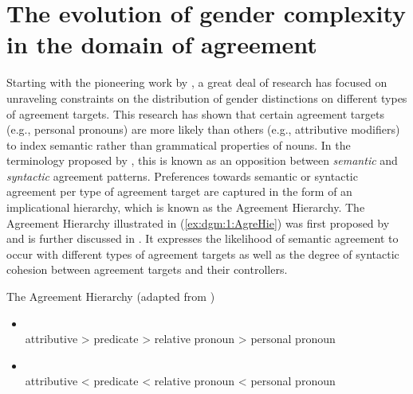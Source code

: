 \documentclass[output=collectionpaper]{langsci/langscibook}
\begin{document}
\section{The evolution of gender complexity in the domain of agreement}
\label{sec:dgm:EvAgr}
\largerpage
Starting with the pioneering work by \citet{Corbett1979,Corbett1991}, a great deal of research has focused on unraveling constraints on the distribution of gender distinctions on different types of agreement targets. This research has shown that certain agreement targets (e.g., personal pronouns) are more likely than others (e.g., attributive modifiers) to index semantic rather than grammatical properties of nouns.
In the terminology proposed by \citet{Corbett1979,Corbett1991}, this is known as an opposition between \textit{semantic} and \textit{syntactic} agreement patterns. Preferences towards semantic or syntactic agreement per type of agreement target are captured in the form of an implicational hierarchy, which is known as the Agreement Hierarchy. The Agreement Hierarchy \textendash{} illustrated in (\ref{ex:dgm:1:AgreHie}) \textendash{} was first proposed by \citet{Corbett1979} and is further discussed in \citet{Corbett1991,Corbett2000,Corbett2006}. It expresses the likelihood of semantic agreement to occur with different types of agreement targets as well as the degree of syntactic cohesion between agreement targets and their controllers.

\ea\label{ex:dgm:1:AgreHie}
The Agreement Hierarchy (adapted from \citealt{Corbett2010})\\
\begin{itemize}

\item {}\\
attributive {\textgreater}  predicate  {\textgreater} relative pronoun {\textgreater} personal pronoun

\item {}\\
attributive  {\textless} predicate {\textless} relative pronoun {\textless}  personal pronoun

\end{itemize}
\z
\end{document}

